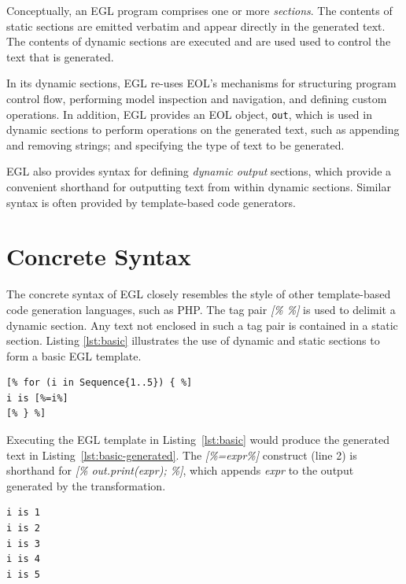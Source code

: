Conceptually, an EGL program comprises one or more \emph{sections}. The contents of static
sections are emitted verbatim and appear directly in the
generated text. The contents of dynamic sections are executed and are used
used to control the text that is generated.

In its dynamic sections, EGL re-uses EOL's mechanisms for structuring
program control flow, performing model inspection and navigation, and
defining custom operations. In addition, EGL provides an EOL object, \verb|out|,
which is used in dynamic sections to perform operations on the generated text, 
such as appending and removing strings; and specifying the type of text to be generated.

EGL also provides syntax for defining \textit{dynamic output}
sections, which provide a convenient shorthand for outputting text
from within dynamic sections. Similar syntax is often provided by
template-based code generators.

\section{Concrete Syntax}
\label{concretesyntax}

The concrete syntax of EGL closely resembles the style of other
template-based code generation languages, such as PHP. The tag pair \emph{[\% \%]} is
used to delimit a dynamic section. Any text not enclosed in such a tag
pair is contained in a static section. Listing
\ref{lst:basic} illustrates the use of dynamic and static sections to
form a basic EGL template.

\begin{lstlisting}[basicstyle=\ttfamily\footnotesize, language=EGL, tabsize=2, flexiblecolumns=true, caption=A basic EGL template., label=lst:basic]
[% for (i in Sequence{1..5}) { %]
i is [%=i%]
[% } %]
\end{lstlisting}

Executing the EGL template in Listing~\ref{lst:basic} would produce the generated
text in Listing~\ref{lst:basic-generated}. The \emph{[\%=expr\%]} construct (line 2) is shorthand for \emph{[\%
  out.print(expr); \%]}, which appends \emph{expr} to the output
generated by the transformation.

\begin{lstlisting}[basicstyle=\ttfamily\footnotesize, language=EGL, tabsize=2, flexiblecolumns=true, caption=The text generated from the basic EGL template (Listing~\ref{lst:basic})., label=lst:basic-generated]
i is 1
i is 2
i is 3
i is 4
i is 5
\end{lstlisting}

